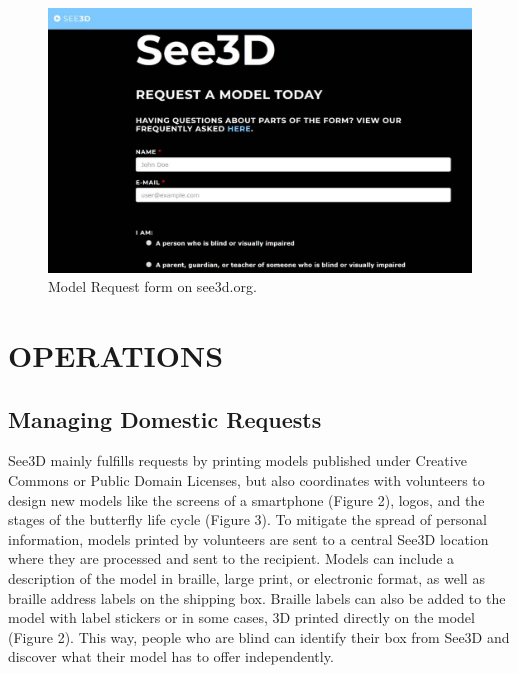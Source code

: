 \documentclass[11.5pt]{sig-alternate} %
\begin{document}
\begin{large}
\begin{figure}[ht]
    \centering
    \includegraphics[width=1\linewidth]{1116_Fig1.jpg}
    \caption{Model Request form on see3d.org.}
\end{figure}

\section*{OPERATIONS}

\subsection*{Managing Domestic Requests}

See3D mainly fulfills requests by printing models published under Creative Commons or Public Domain Licenses, but also coordinates with volunteers to design new models like the screens of a smartphone (Figure 2), logos, and the stages of the butterfly life cycle (Figure 3). To mitigate the spread of personal information, models printed by volunteers are sent to a central See3D location where they are processed and sent to the recipient. Models can include a description of the model in braille, large print, or electronic format, as well as braille address labels on the shipping box. Braille labels can also be added to the model with label stickers or in some cases, 3D printed directly on the model (Figure 2). This way, people who are blind can identify their box from See3D and discover what their model has to offer independently.


\end{large}
\end{document}
